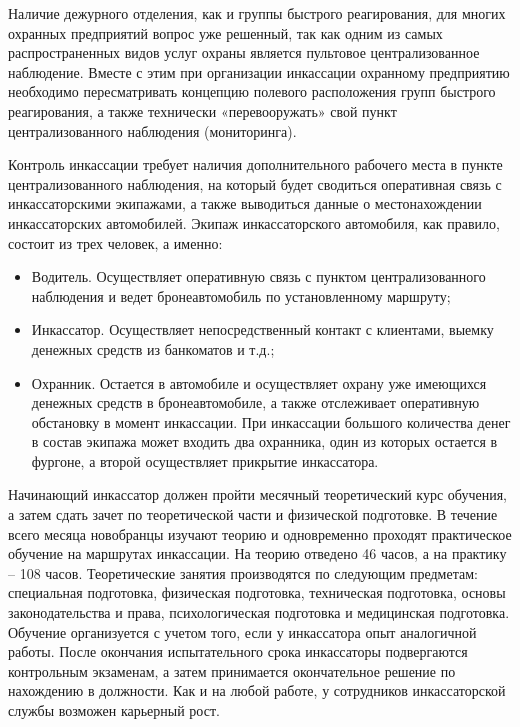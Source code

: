 \documentclass[a4paper,12pt,fleqn]{article} %
\begin{document}
Наличие дежурного отделения, как и группы быстрого реагирования, для многих охранных предприятий вопрос уже решенный, так как одним из самых распространенных видов услуг охраны является пультовое централизованное наблюдение. Вместе с этим при организации инкассации охранному предприятию необходимо пересматривать концепцию полевого расположения групп быстрого реагирования, а также технически «перевооружать» свой пункт централизованного наблюдения (мониторинга). 

Контроль инкассации требует наличия дополнительного рабочего места в пункте централизованного наблюдения, на который будет сводиться оперативная связь с инкассаторскими экипажами, а также выводиться данные о местонахождении инкассаторских автомобилей. Экипаж инкассаторского автомобиля, как правило, состоит из трех человек, а именно: 

\begin{itemize}
	\item Водитель. Осуществляет оперативную связь с пунктом централизованного наблюдения и ведет бронеавтомобиль по установленному маршруту; 
	\item Инкассатор. Осуществляет непосредственный контакт с клиентами, выемку денежных средств из банкоматов и т.д.; 
	\item Охранник. Остается в автомобиле и осуществляет охрану уже имеющихся денежных средств в бронеавтомобиле, а также отслеживает оперативную обстановку в момент инкассации. При инкассации большого количества денег в состав экипажа может входить два охранника, один из которых остается в фургоне, а второй осуществляет прикрытие инкассатора. 
\end{itemize}

Начинающий инкассатор должен пройти месячный теоретический курс обучения, а затем сдать зачет по теоретической части и физической подготовке. В течение всего месяца новобранцы изучают теорию и одновременно проходят практическое обучение на маршрутах инкассации. На теорию отведено 46 часов, а на практику – 108 часов. Теоретические занятия производятся по следующим предметам: специальная подготовка, физическая подготовка, техническая подготовка, основы законодательства и права, психологическая подготовка и медицинская подготовка. Обучение организуется с учетом того, если у инкассатора опыт аналогичной работы. После окончания испытательного срока инкассаторы подвергаются контрольным экзаменам, а затем принимается окончательное решение по нахождению в должности. Как и на любой работе, у сотрудников инкассаторской службы возможен карьерный рост. \\
\end{document}
